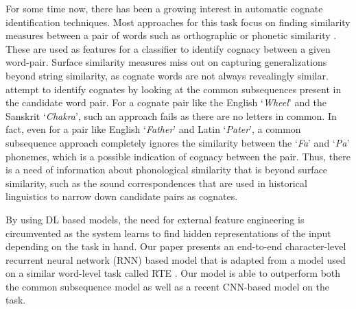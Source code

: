 \documentclass[11pt,letterpaper]{article}
\begin{document}
For some time now, there has been a growing interest in automatic cognate identification techniques. Most approaches for this task focus on finding similarity measures between a pair of words such as orthographic or phonetic similarity \cite{hauer2011clustering} \cite{inkpen2005similarity} \cite{List2016g}. These are used as features for a classifier to identify cognacy between a given word-pair. Surface similarity measures miss out on capturing generalizations beyond string similarity, as cognate words are not always revealingly similar. \citet{rama2015automatic} attempt to identify cognates by looking at the common subsequences present in the candidate word pair. For a cognate pair like the English `\textit{Wheel}' and the Sanskrit `\textit{Chakra}', such an approach fails as there are no letters in common. In fact, even for a pair like English `\textit{Father}' and Latin `\textit{Pater}', a common subsequence approach completely ignores the similarity between the `\textit{Fa}' and `\textit{Pa}' phonemes, which is a possible indication of cognacy between the pair. Thus, there is a need of information about phonological similarity that is beyond surface similarity, such as the sound correspondences that are used in historical linguistics to narrow down candidate pairs as cognates.

By using DL based models, the need for external feature engineering is circumvented as the system learns to find hidden representations of the input depending on the task in hand. Our paper presents an end-to-end character-level recurrent neural network (RNN) based model that is adapted from a model used on a similar word-level task called RTE \cite{rocktaschel2016reasoning}. Our model is able to outperform both the common subsequence model \cite{rama2015automatic} as well as a recent CNN-based model \cite{rama2016siamese} on the task. 



\end{document}
